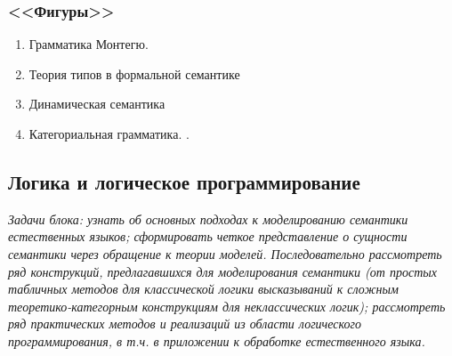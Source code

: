 \documentclass[a4paper,12pt]{article}
\begin{document}
\subsubsection{<<Фигуры>>}
\begin{enumerate}
  \item Грамматика Монтегю. 
  \item Теория типов в формальной семантике
  \item Динамическая семантика 
  \item Категориальная грамматика. 
    .
\end{enumerate}


\subsection{Логика и логическое программирование}

\textit{Задачи блока: узнать об основных подходах к моделированию семантики естественных языков; сформировать четкое представление о сущности семантики через обращение к теории моделей. Последовательно рассмотреть ряд конструкций, предлагавшихся для моделирования семантики (от простых табличных методов для классической логики высказываний к сложным теоретико-категорным конструкциям для неклассических логик); рассмотреть ряд практических методов и реализаций из области логического программирования, в т.ч. в приложении к обработке естественного языка.}
\end{document}
